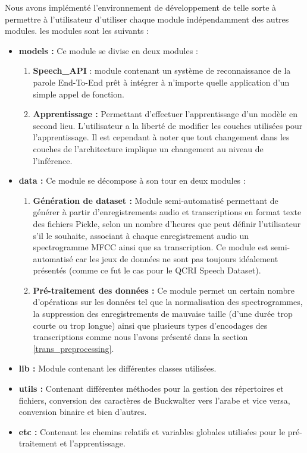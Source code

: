 Nous avons implémenté l'environnement de développement de telle sorte à permettre à l'utilisateur d'utiliser chaque module indépendamment des autres modules. les modules sont les suivants : 
\begin{itemize}
    \item \textbf{models : } Ce module se divise en deux modules :
    \begin{enumerate}
        \item \textbf{Speech\_API} : module contenant un système de reconnaissance de la parole End-To-End prêt à intégrer à n'importe quelle application d'un simple appel de fonction.
        \item \textbf{Apprentissage :} Permettant d'effectuer l'apprentissage d'un modèle en second lieu. L'utilisateur a la liberté de modifier les couches utilisées pour l'apprentissage. Il est cependant à noter que tout changement dans les couches de l'architecture implique un changement au niveau de l'inférence. 
    \end{enumerate}
    \item \textbf{data :} Ce module se décompose à son tour en deux modules : 
        \begin{enumerate}
            \item \textbf{Génération de dataset :} Module semi-automatisé permettant de générer à partir d'enregistrements audio et transcriptions en format texte des fichiers Pickle, selon un nombre d'heures que peut définir l'utilisateur s'il le souhaite, associant à chaque enregistrement audio un spectrogramme MFCC ainsi que sa transcription. Ce module est semi-automatisé car les jeux de données ne sont pas toujours idéalement présentés (comme ce fut le cas pour le QCRI Speech Dataset).
            \item \textbf{Pré-traitement des données :} Ce module permet un certain nombre d'opérations sur les données tel que la normalisation des spectrogrammes, la suppression des enregistrements de mauvaise taille (d'une durée trop courte ou trop longue) ainsi que plusieurs types d'encodages des transcriptions comme nous l'avons présenté dans la section \ref{trans_preprocessing}. 
        \end{enumerate}
    \item \textbf{lib :} Module contenant les différentes classes utilisées.
    \item \textbf{utils :} Contenant différentes méthodes pour la gestion des répertoires et fichiers, conversion des caractères de Buckwalter vers l'arabe et vice versa, conversion binaire et bien d'autres.
    \item \textbf{etc :} Contenant les chemins relatifs et variables globales utilisées pour le pré-traitement et l'apprentissage.\\
\end{itemize}

